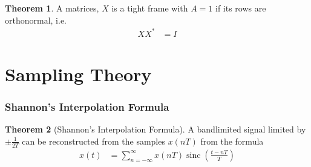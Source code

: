 \documentclass[titlepage, fleqn, a4paper, 12pt, twoside]{article}
\theoremstyle{definition}
\theoremstyle{theorem}
\newtheorem{theorem}{Theorem}
\DeclareMathOperator{\sinc}{\mathrm{sinc}}
\begin{document}
\begin{theorem}
	A matrices, $X$ is a tight frame with $A = 1$ if its rows are orthonormal, i.e.
	\begin{align*}
		X X^* &= I
	\end{align*}
\end{theorem}

\clearpage
\part{Sampling Theory}

\section{Shannon's Interpolation Formula}

\begin{theorem}[Shannon's Interpolation Formula]
	A bandlimited signal limited by $\pm\frac{1}{2 T}$ can be reconstructed from the samples $x(n T)$ from the formula
	\begin{align*}
		x(t) &= \sum\limits_{n = -\infty}^{\infty} x(n T) \sinc\left( \frac{t - n T}{T} \right)
	\end{align*}
	\label{thm:Shannons_Interpolation_Formula}
\end{theorem}

\clearpage
\printindex
\end{document}
